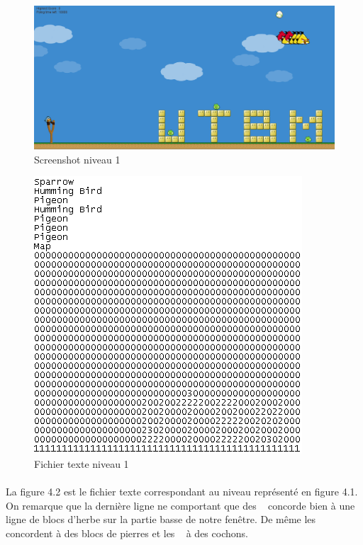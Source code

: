 \documentclass[a4paper,12pt]{report}
\begin{document}
\begin{figure}[H]
\begin{center}
\includegraphics[scale=0.4]{images/lvl01image.png} 
\end{center}
\caption{Screenshot niveau 1}
\label{Screenshot niveau 1}
\end{figure}

\begin{figure}[H]
\begin{center}
\includegraphics[scale=1]{images/lvl01texte.png} 
\end{center}
\caption{Fichier texte niveau 1}
\label{Fichier texte niveau 1}
\end{figure}

\paragraph{}La figure 4.2 est le fichier texte correspondant au niveau représenté en figure 4.1. On remarque que la dernière ligne ne comportant que des \guillemotright~ concorde bien à une ligne de blocs d'herbe sur la partie basse de notre fenêtre. De même les \guillemotright~ concordent à des blocs de pierres et les \guillemotright~ à des cochons.
\end{document}
